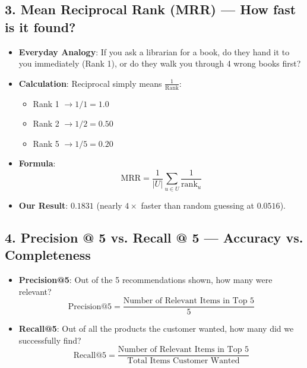 \documentclass[11pt,a4paper]{article}
\begin{document}
\subsection{3. Mean Reciprocal Rank (MRR) --- How fast is it found?}
\begin{itemize}
    \item \textbf{Everyday Analogy}: If you ask a librarian for a book, do they hand it to you immediately (Rank 1), or do they walk you through 4 wrong books first?
    \item \textbf{Calculation}: Reciprocal simply means $\frac{1}{\text{Rank}}$:
    \begin{itemize}[noitemsep]
        \item Rank 1 $\to 1/1 = \mathbf{1.0}$
        \item Rank 2 $\to 1/2 = \mathbf{0.50}$
        \item Rank 5 $\to 1/5 = \mathbf{0.20}$
    \end{itemize}
    \item \textbf{Formula}:
    \begin{equation}
        \text{MRR} = \frac{1}{|U|} \sum_{u \in U} \frac{1}{\text{rank}_u}
    \end{equation}
    \item \textbf{Our Result}: $\mathbf{0.1831}$ (nearly $4\times$ faster than random guessing at $0.0516$).
\end{itemize}

\subsection{4. Precision @ 5 vs. Recall @ 5 --- Accuracy vs. Completeness}
\begin{itemize}
    \item \textbf{Precision@5}: Out of the 5 recommendations shown, how many were relevant?
    \begin{equation}
        \text{Precision@5} = \frac{\text{Number of Relevant Items in Top 5}}{5}
    \end{equation}
    \item \textbf{Recall@5}: Out of all the products the customer wanted, how many did we successfully find?
    \begin{equation}
        \text{Recall@5} = \frac{\text{Number of Relevant Items in Top 5}}{\text{Total Items Customer Wanted}}
    \end{equation}
\end{itemize}
\end{document}
